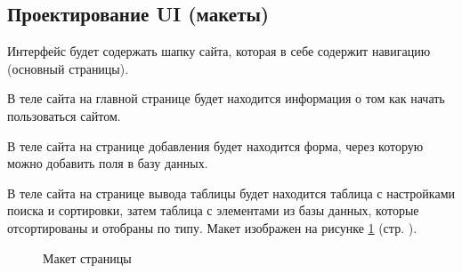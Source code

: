 \subsection{Проектирование UI (макеты)}

Интерфейс будет содержать шапку сайта, которая в себе содержит навигацию (основный страницы).

В теле сайта на главной странице будет находится информация о том как начать пользоваться сайтом.

В теле сайта на странице добавления будет находится форма, через которую можно добавить поля в базу данных.

В теле сайта на странице вывода таблицы будет находится таблица с настройками поиска и сортировки, затем таблица с элементами из базы данных, которые отсортированы и отобраны по типу. Макет изображен на рисунке \ref{fig:layoyt} (стр. \pageref{fig:layoyt}).

\begin{figure}[!htp]
    \caption{Макет страницы}
    \label{fig:layoyt}
\end{figure}